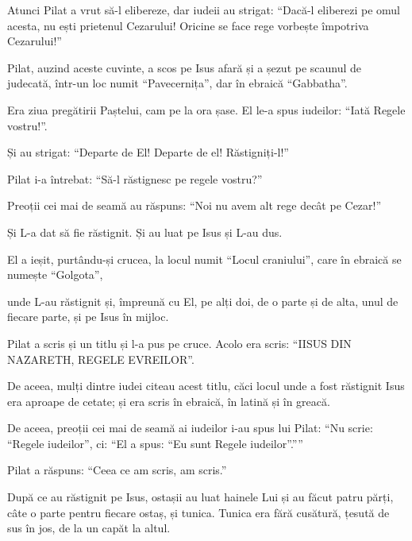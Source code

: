 {\par }{\PP {}Atunci Pilat a vrut să-l elibereze, dar iudeii au strigat: “Dacă-l eliberezi pe omul acesta, nu ești prietenul Cezarului! Oricine se face rege vorbește împotriva Cezarului!”


\par }{\PP {}Pilat, auzind aceste cuvinte, a scos pe Isus afară și a șezut pe scaunul de judecată, într-un loc numit “Pavecernița”, dar în ebraică “Gabbatha”.

Era ziua pregătirii Paștelui, cam pe la ora șase. El le-a spus iudeilor: “Iată Regele vostru!”.


\par }{\PP {}Și au strigat: “Departe de El! Departe de el! Răstigniți-l!”

\par }{\PP Pilat i-a întrebat: “Să-l răstignesc pe regele vostru?”

\par }{\PP Preoții cei mai de seamă au răspuns: “Noi nu avem alt rege decât pe Cezar!”


\par }{\PP {}Și L-a dat să fie răstignit. Și au luat pe Isus și L-au dus.

El a ieșit, purtându-și crucea, la locul numit “Locul craniului”, care în ebraică se numește “Golgota”,

unde L-au răstignit și, împreună cu El, pe alți doi, de o parte și de alta, unul de fiecare parte, și pe Isus în mijloc.

Pilat a scris și un titlu și l-a pus pe cruce. Acolo era scris: “IISUS DIN NAZARETH, REGELE EVREILOR”.

De aceea, mulți dintre iudei citeau acest titlu, căci locul unde a fost răstignit Isus era aproape de cetate; și era scris în ebraică, în latină și în greacă.

De aceea, preoții cei mai de seamă ai iudeilor i-au spus lui Pilat: “Nu scrie: “Regele iudeilor”, ci: “El a spus: “Eu sunt Regele iudeilor”.””


\par }{\PP {}Pilat a răspuns: “Ceea ce am scris, am scris.”


\par }{\PP {}După ce au răstignit pe Isus, ostașii au luat hainele Lui și au făcut patru părți, câte o parte pentru fiecare ostaș, și tunica. Tunica era fără cusătură, țesută de sus în jos, de la un capăt la altul.

}
